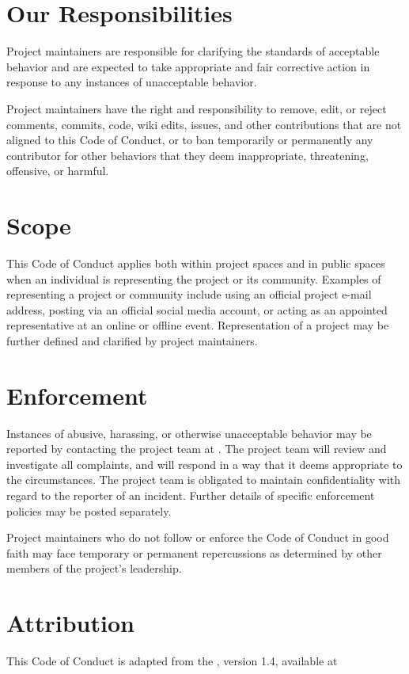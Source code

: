 \documentclass[letterpaper,10pt,english]{sphinxmanual}
\begin{document}
\section{Our Responsibilities}
\label{\detokenize{coc_link:our-responsibilities}}
Project maintainers are responsible for clarifying the standards of acceptable behavior and are expected to take appropriate and fair corrective action in response to any instances of unacceptable behavior.

Project maintainers have the right and responsibility to remove, edit, or reject comments, commits, code, wiki edits, issues, and other contributions that are not aligned to this Code of Conduct, or to ban temporarily or permanently any contributor for other behaviors that they deem inappropriate, threatening, offensive, or harmful.


\section{Scope}
\label{\detokenize{coc_link:scope}}
This Code of Conduct applies both within project spaces and in public spaces when an individual is representing the project or its community. Examples of representing a project or community include using an official project e-mail address, posting via an official social media account, or acting as an appointed representative at an online or offline event. Representation of a project may be further defined and clarified by project maintainers.


\section{Enforcement}
\label{\detokenize{coc_link:enforcement}}
Instances of abusive, harassing, or otherwise unacceptable behavior may be reported by contacting the project team at . The project team will review and investigate all complaints, and will respond in a way that it deems appropriate to the circumstances. The project team is obligated to maintain confidentiality with regard to the reporter of an incident. Further details of specific enforcement policies may be posted separately.

Project maintainers who do not follow or enforce the Code of Conduct in good faith may face temporary or permanent repercussions as determined by other members of the project’s leadership.


\section{Attribution}
\label{\detokenize{coc_link:attribution}}
This Code of Conduct is adapted from the , version 1.4, available at 
\end{document}
